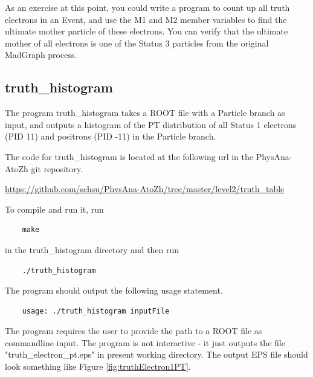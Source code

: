 \documentclass{article}
\begin{document}
As an exercise at this point, you could write a program to count up all truth electrons in an Event, and use the M1 and M2 member variables to find the ultimate mother particle of these electrons. You can verify that the ultimate mother of all electrons is one of the Status 3 particles from the original MadGraph process.

\subsection{truth\_histogram}

The program truth\_histogram takes a ROOT file with a Particle branch as input, and outputs a histogram of the PT distribution of all Status 1 electrons (PID 11) and positrons (PID -11) in the Particle branch.

\bigskip

The code for truth\_histogram is located at the following url in the PhysAna-AtoZh git repository.

\bigskip

\url{https://github.com/schsu/PhysAna-AtoZh/tree/master/level2/truth_table}

\bigskip

To compile and run it, run

\begin{verbatim}
	make
\end{verbatim} 

in the truth\_histogram directory and then run

\begin{verbatim}
	./truth_histogram
\end{verbatim}

The program should output the following usage statement.

\begin{verbatim}
	usage: ./truth_histogram inputFile
\end{verbatim}

The program requires the user to provide the path to a ROOT file as commandline input. The program is not interactive - it just outputs the file "truth\_electron\_pt.eps" in present working directory. The output EPS file should look something like Figure \ref{fig:truthElectron1PT}.
\end{document}
